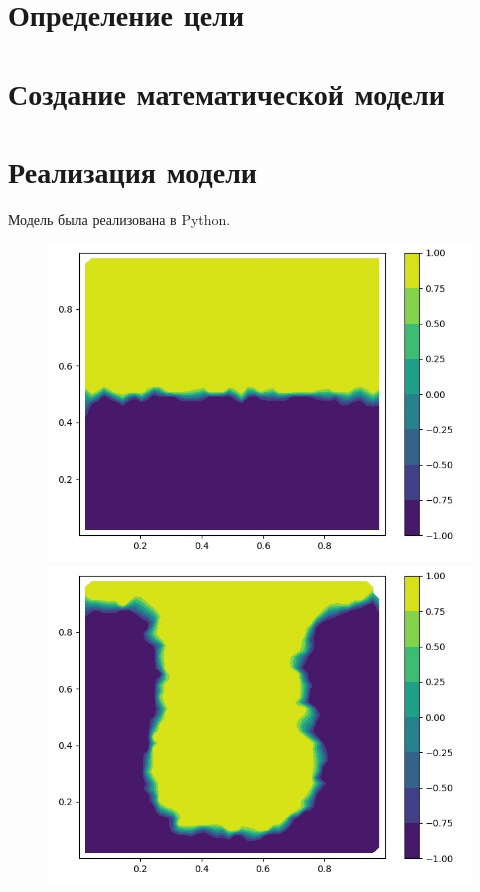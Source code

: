 \documentclass[a4paper, 14pt]{extarticle}
\begin{document}
	\pagebreak	

	\section{Определение цели}
		
	\section{Создание математической модели}

	\section{Реализация модели}
		Модель была реализована в Python.
		\begin{figure}[H]
			\begin{minipage}{0.5\textwidth}
				\centering
				\includegraphics[width = \linewidth]{1.jpg}
			\end{minipage}\hfill
			\begin{minipage}{0.5\textwidth}
				\centering
				\includegraphics[width = \linewidth]{2.jpg}
			\end{minipage}\hfill
		\end{figure}
	
\end{document}

